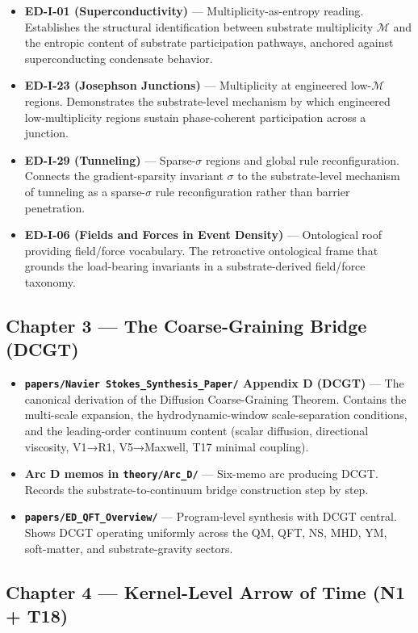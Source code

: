 \documentclass[11pt]{book}
\begin{document}
\begin{itemize}
\item \textbf{ED-I-01 (Superconductivity)} — Multiplicity-as-entropy reading. Establishes the structural identification between substrate multiplicity $\mathcal{M}$ and the entropic content of substrate participation pathways, anchored against superconducting condensate behavior.
\item \textbf{ED-I-23 (Josephson Junctions)} — Multiplicity at engineered low-$\mathcal{M}$ regions. Demonstrates the substrate-level mechanism by which engineered low-multiplicity regions sustain phase-coherent participation across a junction.
\item \textbf{ED-I-29 (Tunneling)} — Sparse-$\sigma$ regions and global rule reconfiguration. Connects the gradient-sparsity invariant $\sigma$ to the substrate-level mechanism of tunneling as a sparse-$\sigma$ rule reconfiguration rather than barrier penetration.
\item \textbf{ED-I-06 (Fields and Forces in Event Density)} — Ontological roof providing field/force vocabulary. The retroactive ontological frame that grounds the load-bearing invariants in a substrate-derived field/force taxonomy.
\end{itemize}

\subsection{Chapter 3 — The Coarse-Graining Bridge (DCGT)}

\begin{itemize}
\item \textbf{\texttt{papers/Navier Stokes\_Synthesis\_Paper/} Appendix D (DCGT)} — The canonical derivation of the Diffusion Coarse-Graining Theorem. Contains the multi-scale expansion, the hydrodynamic-window scale-separation conditions, and the leading-order continuum content (scalar diffusion, directional viscosity, V1→R1, V5→Maxwell, T17 minimal coupling).
\item \textbf{Arc D memos in \texttt{theory/Arc\_D/}} — Six-memo arc producing DCGT. Records the substrate-to-continuum bridge construction step by step.
\item \textbf{\texttt{papers/ED\_QFT\_Overview/}} — Program-level synthesis with DCGT central. Shows DCGT operating uniformly across the QM, QFT, NS, MHD, YM, soft-matter, and substrate-gravity sectors.
\end{itemize}

\subsection{Chapter 4 — Kernel-Level Arrow of Time (N1 + T18)}
\end{document}
